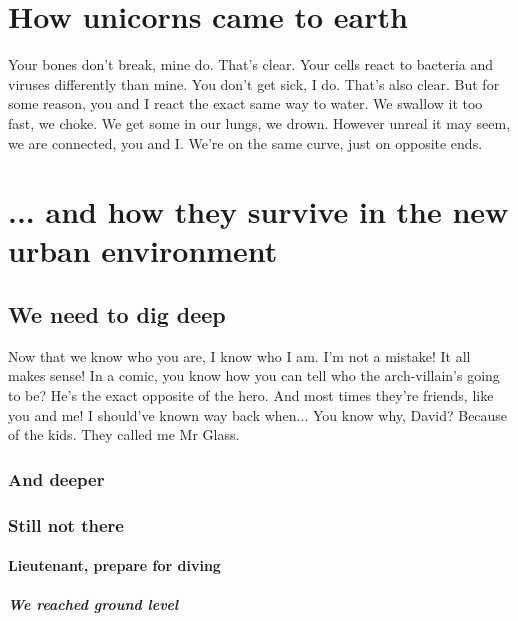 
\section{How unicorns came to earth}
Your bones don't break, mine do. That's clear. Your cells react to bacteria and viruses differently than mine. You don't get sick, I do. That's also clear. But for some reason, you and I react the exact same way to water. We swallow it too fast, we choke. We get some in our lungs, we drown. However unreal it may seem, we are connected, you and I. We're on the same curve, just on opposite ends.

\section{... and how they survive in the new urban environment}
\subsection{We need to dig deep}
Now that we know who you are, I know who I am. I'm not a mistake! It all makes sense! In a comic, you know how you can tell who the arch-villain's going to be? He's the exact opposite of the hero. And most times they're friends, like you and me! I should've known way back when... You know why, David? Because of the kids. They called me Mr Glass.

\subsubsection{And deeper}
\subsubsection{Still not there}
\paragraph{Lieutenant, prepare for diving}
\subparagraph{We reached ground level}
